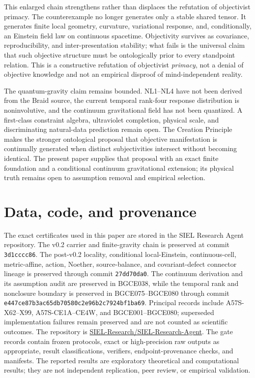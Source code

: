 \documentclass[11pt]{article}
\theoremstyle{definition}
\theoremstyle{remark}
\begin{document}
This enlarged chain strengthens rather than displaces the refutation of objectivist primacy. The counterexample no longer generates only a stable shared tensor. It generates finite local geometry, curvature, variational response, and, conditionally, an Einstein field law on continuous spacetime. Objectivity survives as covariance, reproducibility, and inter-presentation stability; what fails is the universal claim that such objective structure must be ontologically prior to every standpoint relation. This is a constructive refutation of objectivist \emph{primacy}, not a denial of objective knowledge and not an empirical disproof of mind-independent reality.

The quantum-gravity claim remains bounded. NL1--NL4 have not been derived from the Braid source, the current temporal rank-four response distribution is noninvolutive, and the continuum gravitational field has not been quantized. A first-class constraint algebra, ultraviolet completion, physical scale, and discriminating natural-data prediction remain open. The Creation Principle makes the stronger ontological proposal that objective manifestation is continually generated when distinct subjectivities intersect without becoming identical. The present paper supplies that proposal with an exact finite foundation and a conditional continuum gravitational extension; its physical truth remains open to assumption removal and empirical selection.

\section*{Data, code, and provenance}

The exact certificates used in this paper are stored in the SIEL Research Agent repository. The v0.2 carrier and finite-gravity chain is preserved at commit \texttt{3d1cccc86}. The post-v0.2 locality, conditional local-Einstein, continuous-cell, metric-affine, action, Noether, source-balance, and covariant-defect connector lineage is preserved through commit \texttt{27dd70da0}. The continuum derivation and its assumption audit are preserved in BGCE038, while the temporal rank and nonclosure boundary is preserved in BGCE075--BGCE080 through commit \texttt{e447ce87b3ac65db70580c2e96b2c7924bf1ba69}. Principal records include A57S-X62--X99, A57S-CE1A--CE4W, and BGCE001--BGCE080; superseded implementation failures remain preserved and are not counted as scientific outcomes. The repository is
\href{https://github.com/SIEL-Research/SIEL-Research-Agent}{SIEL-Research/SIEL-Research-Agent}.
The gate records contain frozen protocols, exact or high-precision raw outputs as appropriate, result classifications, verifiers, endpoint-provenance checks, and manifests. The reported results are exploratory theoretical and computational results; they are not independent replication, peer review, or empirical validation.
\end{document}
